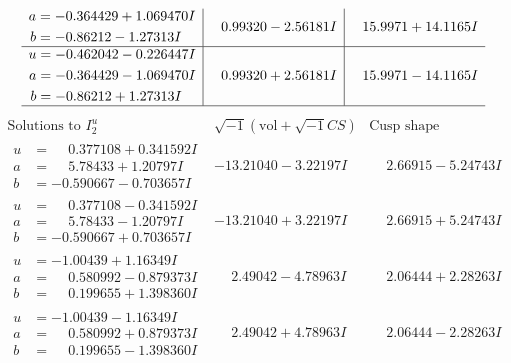 \documentclass[1p]{elsarticle_modified}
\theoremstyle{definition}
\newcommand{\I}{\sqrt{-1}}
\begin{document}
$$\begin{array}{c|c|c}
\begin{aligned}
a &= -0.364429 + 1.069470 I \\
b &= -0.86212 - 1.27313 I\end{aligned}
 & \phantom{-}0.99320 - 2.56181 I & \phantom{-}15.9971 + 14.1165 I \\ \hline\begin{aligned}
u &= -0.462042 - 0.226447 I \\
a &= -0.364429 - 1.069470 I \\
b &= -0.86212 + 1.27313 I\end{aligned}
 & \phantom{-}0.99320 + 2.56181 I & \phantom{-}15.9971 - 14.1165 I\\
 \hline 
 \end{array}$$\newpage$$\begin{array}{c|c|c}  
\text{Solutions to }I^u_{2}& \I (\text{vol} + \sqrt{-1}CS) & \text{Cusp shape}\\
 \hline 
\begin{aligned}
u &= \phantom{-}0.377108 + 0.341592 I \\
a &= \phantom{-}5.78433 + 1.20797 I \\
b &= -0.590667 - 0.703657 I\end{aligned}
 & -13.21040 - 3.22197 I & \phantom{-}2.66915 - 5.24743 I \\ \hline\begin{aligned}
u &= \phantom{-}0.377108 - 0.341592 I \\
a &= \phantom{-}5.78433 - 1.20797 I \\
b &= -0.590667 + 0.703657 I\end{aligned}
 & -13.21040 + 3.22197 I & \phantom{-}2.66915 + 5.24743 I \\ \hline\begin{aligned}
u &= -1.00439 + 1.16349 I \\
a &= \phantom{-}0.580992 - 0.879373 I \\
b &= \phantom{-}0.199655 + 1.398360 I\end{aligned}
 & \phantom{-}2.49042 - 4.78963 I & \phantom{-}2.06444 + 2.28263 I \\ \hline\begin{aligned}
u &= -1.00439 - 1.16349 I \\
a &= \phantom{-}0.580992 + 0.879373 I \\
b &= \phantom{-}0.199655 - 1.398360 I\end{aligned}
 & \phantom{-}2.49042 + 4.78963 I & \phantom{-}2.06444 - 2.28263 I \\ \hline\begin{aligned}

\end{aligned}
\end{array}$$
\end{document}
